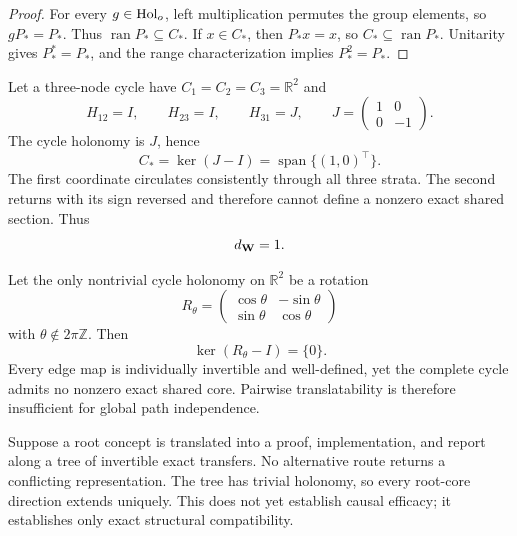 \begin{proof}
For every \(g\in\operatorname{Hol}_o\), left multiplication permutes the group elements, so
\(gP_*=P_*\). Thus \(\operatorname{ran}P_*\subseteq C_*\). If
\(x\in C_*\), then \(P_*x=x\), so \(C_*\subseteq\operatorname{ran}P_*\).
Unitarity gives \(P_*^*=P_*\), and the range characterization implies
\(P_*^2=P_*\).
\end{proof}


\begin{example}\label{ex:reflection-cycle}
Let a three-node cycle have \(C_1=C_2=C_3=\mathbb R^2\) and
\[
H_{12}=I,
\qquad
H_{23}=I,
\qquad
H_{31}=J,
\qquad
J=
\begin{pmatrix}
1&0\\
0&-1
\end{pmatrix}.
\]
The cycle holonomy is \(J\), hence
\[
C_*=\ker(J-I)=\operatorname{span}\{(1,0)^\top\}.
\]
The first coordinate circulates consistently through all three strata. The
second returns with its sign reversed and therefore cannot define a nonzero
exact shared section. Thus
\[
d_{\mathbf W}=1.
\]
\end{example}

\begin{example}\label{ex:rotation-obstruction}
Let the only nontrivial cycle holonomy on \(\mathbb R^2\) be a rotation
\[
R_\theta=
\begin{pmatrix}
\cos\theta&-\sin\theta\\
\sin\theta&\cos\theta
\end{pmatrix}
\]
with \(\theta\notin2\pi\mathbb Z\). Then
\[
\ker(R_\theta-I)=\{0\}.
\]
Every edge map is individually invertible and well-defined, yet the complete
cycle admits no nonzero exact shared core. Pairwise translatability is
therefore insufficient for global path independence.
\end{example}

\begin{example}\label{ex:tree-workspace}
Suppose a root concept is translated into a proof, implementation, and report
along a tree of invertible exact transfers. No alternative route returns a
conflicting representation. The tree has trivial holonomy, so every root-core
direction extends uniquely. This does not yet establish causal efficacy; it
establishes only exact structural compatibility.
\end{example}

